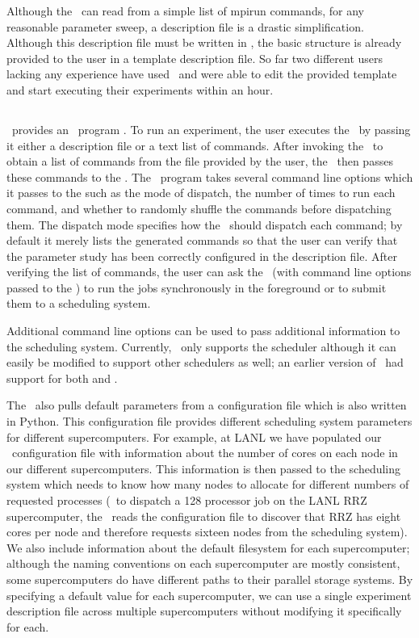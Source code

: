 Although the \cg\ can read from a simple list of mpirun commands, for any
reasonable parameter sweep, a description file is a drastic simplification.
Although this description file must be written in , the basic
structure is already provided to the user in a template description file.  
So far two different users lacking any  experience have used
\name\ and were able to edit the provided template and start executing their
experiments within an hour. 

\subsection{\Dispatcher}

\name\ provides an \manager\ program .  To run an experiment,
the user executes the \manager\ by passing it either a description file or a
text list of commands.  After invoking the \cg\ to obtain a list of commands
from the file provided by the user, the \manager\ then passes these commands to
the \dispatcher.  The \manager\ program takes several command line options
which it passes to the \dispatcher such as the mode of dispatch, the number of
times to run each command, and whether to randomly shuffle the commands before
dispatching them.  The dispatch mode specifies how the \dispatcher\ should
dispatch each command; by default it merely lists the generated commands so
that the user can verify that the parameter study has been correctly configured
in the description file.  After verifying the list of commands, the user can
ask the \dispatcher\ (with command line options passed to the \manager) to run
the jobs synchronously in the foreground or to submit them to a scheduling
system.  

Additional command line options can be used to pass additional information to
the scheduling system.  Currently, \name\ only supports the 
scheduler although it can easily be modified to support other schedulers as
well; an earlier version of \name\ had support for both  and
.  

The \dispatcher\ also pulls default parameters from a configuration file which
is also written in Python.  This configuration file provides different
scheduling system parameters for different supercomputers.  For example, at
LANL we have populated our \name\ configuration file with information about the
number of cores on each node in our different supercomputers.  This information
is then passed to the scheduling system which needs to know how many nodes to
allocate for different numbers of requested processes (\eg\ to dispatch a 128
processor job on the LANL RRZ supercomputer, the \dispatcher\ reads the
configuration file to discover that RRZ has eight cores per node and therefore
requests sixteen nodes from the scheduling system).  We also include
information about the default filesystem for each supercomputer; although the
naming conventions on each supercomputer are mostly consistent, some
supercomputers do have different paths to their parallel storage systems.  By
specifying a default value for each supercomputer, we can use a single
experiment description file across multiple supercomputers without modifying it
specifically for each. 

